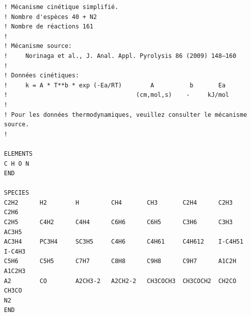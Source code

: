 \begin{verbatim}
! Mécanisme cinétique simplifié.
! Nombre d'espèces 40 + N2
! Nombre de réactions 161
!
! Mécanisme source: 
!     Norinaga et al., J. Anal. Appl. Pyrolysis 86 (2009) 148–160
!
! Données cinétiques:
!     k = A * T**b * exp (-Ea/RT)        A          b       Ea
!                                    (cm,mol,s)    -     kJ/mol
! 
! Pour les données thermodynamiques, veuillez consulter le mécanisme source.
!

ELEMENTS
C H O N
END

SPECIES
C2H2      H2        H         CH4       CH3       C2H4      C2H3      C2H6
C2H5      C4H2      C4H4      C6H6      C6H5      C3H6      C3H3      AC3H5
AC3H4     PC3H4     SC3H5     C4H6      C4H61     C4H612    I-C4H51   I-C4H3
C5H6      C5H5      C7H7      C8H8      C9H8      C9H7      A1C2H     A1C2H3
A2        CO        A2CH3-2   A2CH2-2   CH3COCH3  CH3COCH2  CH2CO     CH3CO
N2
END


\end{verbatim}
